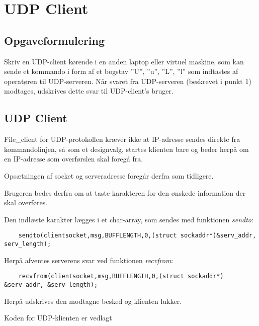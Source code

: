 \chapter{UDP Client}

\section{Opgaveformulering}

Skriv en UDP-client kørende i en anden laptop eller virtuel maskine, som kan sende
et kommando i form af et bogstav ”U”, ”u”, ”L”, ”l” som indtastes af operatøren til
UDP-serveren. Når svaret fra UDP-serveren (beskrevet i punkt 1) modtages,
udskrives dette svar til UDP-client’s bruger. 


\section{UDP Client}

File\_client for UDP-protokollen kræver ikke at IP-adresse sendes direkte fra kommandolinjen, så som et designvalg, startes klienten bare og beder herpå om en IP-adresse som overførslen skal foregå fra. 

Opsætningen af socket og serveradresse foregår derfra som tidligere. 

Brugeren bedes derfra om at taste karakteren for den ønskede information der skal overføres. 

Den indlæste karakter lægges i et char-array, som sendes med funktionen \textit{sendto}:

\begin{lstlisting}
	sendto(clientsocket,msg,BUFFLENGTH,0,(struct sockaddr*)&serv_addr, serv_length);
\end{lstlisting}

Herpå afventes serverens svar ved funktionen \textit{recvfrom}:

\begin{lstlisting}
	recvfrom(clientsocket,msg,BUFFLENGTH,0,(struct sockaddr*) &serv_addr, &serv_length);
\end{lstlisting}

Herpå udskrives den modtagne besked og klienten lukker.


Koden for UDP-klienten er vedlagt